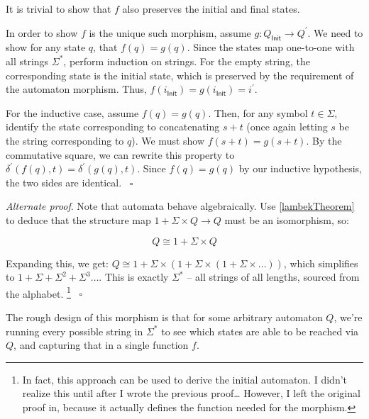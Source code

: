 \documentclass{article}
\theoremstyle{plain}
\theoremstyle{definition}
\begin{document}
It is trivial to show that \ensuremath{f} also preserves the initial and final states.

In order to show \ensuremath{f} is the unique such morphism, assume \ensuremath{g : {Q}_{\mathsf{Init}} \rightarrow {Q}^{'}}. We need to show for any state \ensuremath{q}, that \ensuremath{f\left( q \right) = g\left( q \right)}. Since the states map one-to-one with all strings \ensuremath{{\Sigma }^{\ast }}, perform induction on strings. For the empty string, the corresponding state is the initial state, which is preserved by the requirement of the automaton morphism. Thus, \ensuremath{f\left( {i}_{\mathsf{Init}} \right) = g\left( {i}_{\mathsf{Init}} \right) = {i}^{'}}.

For the inductive case, assume \ensuremath{f\left( q \right) = g\left( q \right)}. Then, for any symbol \ensuremath{t \in \Sigma}, identify the state corresponding to concatenating \ensuremath{s + t} (once again letting \ensuremath{s} be the string corresponding to \ensuremath{q}). We must show \ensuremath{f\left( s + t \right) = g\left( s + t \right)}. By the commutative square, we can rewrite this property to \ensuremath{{\delta }^{'}\left( f\left( q \right), t \right) = {\delta }^{'}\left( g\left( q \right), t \right)}. Since \ensuremath{f\left( q \right) = g\left( q \right)} by our inductive hypothesis, the two sides are identical.  ~\ensuremath{\square}

\emph{Alternate proof}.  Note that automata behave algebraically. Use \ref{lambekTheorem} to deduce that the structure map \ensuremath{1 + \Sigma \times Q \rightarrow Q} must be an isomorphism, so:

\[
Q \cong 1 + \Sigma \times Q
\]

Expanding this, we get: \ensuremath{Q \cong 1 + \Sigma \times \left( 1 + \Sigma \times \left( 1 + \Sigma \times \ldots \right) \right)}, which simplifies to \ensuremath{1 + \Sigma + {\Sigma }^{2} + {\Sigma }^{3} \ldots}. This is exactly \ensuremath{{\Sigma }^{\ast }} -- all strings of all lengths, sourced from the alphabet. \footnote{ In fact, this approach can be used to derive the initial automaton. I didn't realize this until after I wrote the previous proof\ldots{} However, I left the original proof in, because it actually defines the function needed for the morphism. }  ~\ensuremath{\square}

The rough design of this morphism is that for some arbitrary automaton \ensuremath{Q}, we're running every possible string in \ensuremath{{\Sigma }^{\ast }} to see which states are able to be reached via \ensuremath{Q}, and capturing that in a single function \ensuremath{f}.
\end{document}
